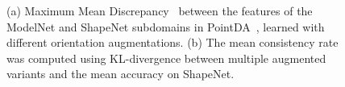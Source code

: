 \begin{figure}[t]
    \captionsetup[subfloat]{justification=centering,singlelinecheck=false}
    \centering
    \vspace{-3mm}
    \caption{(a) Maximum Mean Discrepancy~\cite{borgwardt2006integrating} between the features of the ModelNet and ShapeNet subdomains in PointDA~\cite{qin2019pointdan}, learned with different orientation augmentations. (b) The mean consistency rate was computed using KL-divergence between multiple augmented variants and the mean accuracy on ShapeNet.}
    \vspace{-5mm}
    \label{fig:analysis}
\end{figure}
